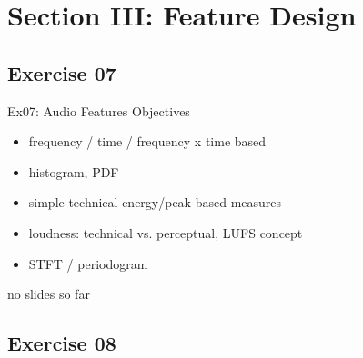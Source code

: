 \documentclass[mathserif, aspectratio=1610]{intbeamer}
\begin{document}



\section{Section III: Feature Design}

\subsection{Exercise 07}
\begin{frame}{Ex07: Audio Features}
Objectives
\begin{itemize}
\item frequency / time / frequency x time based
\item histogram, PDF
\item simple technical energy/peak based measures
\item loudness: technical vs. perceptual, LUFS concept
\item STFT / periodogram
\end{itemize}

no slides so far

\end{frame}


\subsection{Exercise 08}

\end{document}
